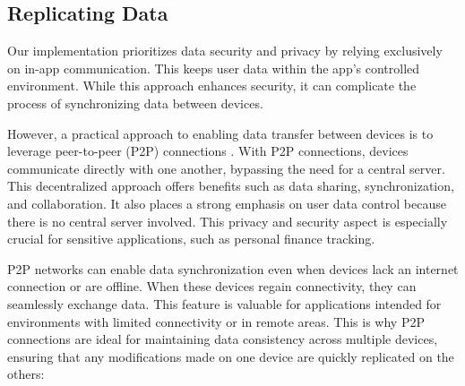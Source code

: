 
\newpage
\subsection{Replicating Data}

Our implementation prioritizes data security and privacy by relying exclusively on in-app communication. This keeps user 
data within the app's controlled environment. While this approach enhances security, it can complicate the process of 
synchronizing data between devices. 

However, a practical approach to enabling data transfer between devices is to leverage peer-to-peer (P2P) connections 
. With P2P connections, devices communicate directly with one another, bypassing the need for a central 
server. This decentralized approach offers benefits such as data sharing, synchronization, and collaboration. It also 
places a strong emphasis on user data control because there is no central server involved. This privacy and security 
aspect is especially crucial for sensitive applications, such as personal finance tracking.

P2P networks can enable data synchronization even when devices lack an internet connection or are offline. When these 
devices regain connectivity, they can seamlessly exchange data. This feature is valuable for applications intended for 
environments with limited connectivity or in remote areas. This is why P2P connections are ideal for maintaining data 
consistency across multiple devices, ensuring that any modifications made on one device are quickly replicated on the 
others:

